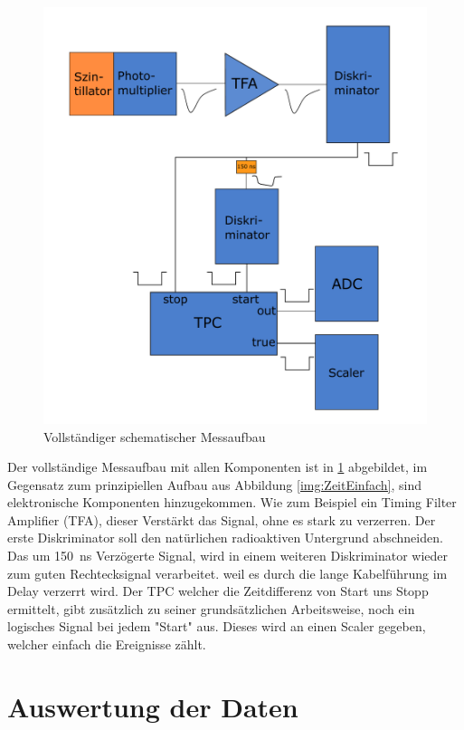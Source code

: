 \documentclass[12pt,a4paper,ngerman]{report}
\begin{document}
	\begin{figure}[ht]
		\centering
		\includegraphics[width=\textwidth]{Bilder/ZeitmessungKomplex.pdf}		
		\caption{Vollständiger schematischer Messaufbau}
		\label{img:ZeitmessungKomplex}
	\end{figure}
	Der vollständige Messaufbau mit allen Komponenten ist in \ref{img:ZeitmessungKomplex} abgebildet, im Gegensatz zum prinzipiellen Aufbau aus Abbildung \ref{img:ZeitEinfach}, sind elektronische Komponenten hinzugekommen. Wie zum Beispiel ein Timing Filter Amplifier (TFA), dieser Verstärkt das Signal, ohne es stark zu verzerren. Der erste Diskriminator soll den natürlichen radioaktiven Untergrund abschneiden. Das um \SI{150}{\nano \second} Verzögerte Signal, wird in einem weiteren Diskriminator wieder zum guten Rechtecksignal verarbeitet. weil es durch die lange Kabelführung im Delay verzerrt wird. Der TPC welcher die Zeitdifferenz von Start uns Stopp ermittelt, gibt zusätzlich zu seiner grundsätzlichen Arbeitsweise, noch ein logisches Signal bei jedem "Start" aus. Dieses wird an einen Scaler gegeben, welcher einfach die Ereignisse zählt.
	
	
	


\chapter{Auswertung der Daten}
\end{document}
